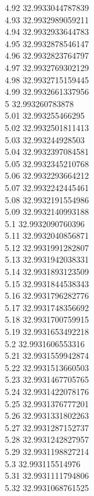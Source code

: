 {4.92	32.9933044787839\\
4.93	32.9932989059211\\
4.94	32.9932933644783\\
4.95	32.9932878546147\\
4.96	32.9932823764797\\
4.97	32.9932769302129\\
4.98	32.9932715159445\\
4.99	32.9932661337956\\
5	32.993260783878\\
5.01	32.993255466295\\
5.02	32.9932501811413\\
5.03	32.993244928503\\
5.04	32.9932397084581\\
5.05	32.9932345210768\\
5.06	32.9932293664212\\
5.07	32.9932242445461\\
5.08	32.9932191554986\\
5.09	32.9932140993188\\
5.1	32.9932090760396\\
5.11	32.9932040856871\\
5.12	32.9931991282807\\
5.13	32.9931942038331\\
5.14	32.9931893123509\\
5.15	32.9931844538343\\
5.16	32.9931796282776\\
5.17	32.9931748356692\\
5.18	32.9931700759915\\
5.19	32.9931653492218\\
5.2	32.9931606553316\\
5.21	32.9931559942874\\
5.22	32.9931513660503\\
5.23	32.9931467705765\\
5.24	32.9931422078176\\
5.25	32.9931376777201\\
5.26	32.9931331802263\\
5.27	32.9931287152737\\
5.28	32.9931242827957\\
5.29	32.9931198827214\\
5.3	32.993115514976\\
5.31	32.9931111794806\\
5.32	32.9931068761525\\
}
